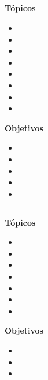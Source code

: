 \subsection{\OSSIETEDef }\label{sec:BOK-OS7}

\textbf{Tópicos}
\begin{itemize}
	\item \OSSIETETopicVision
	\item \OSSIETETopicPolitica
	\item \OSSIETETopicMetodos
	\item \OSSIETETopicProteccion
	\item \OSSIETETopicModelos
	\item \OSSIETETopicProteccionde
	\item \OSSIETETopicEncriptacion
	\item \OSSIETETopicAdministracion
\end{itemize}

\textbf{Objetivos}
\begin{itemize}
	\item \OSSIETEObjUNO
	\item \OSSIETEObjDOS
	\item \OSSIETEObjTRES
	\item \OSSIETEObjCUATRO
	\item \OSSIETEObjCINCO
\end{itemize}

\subsection{\OSOCHODef }\label{sec:BOK-OS8}

\textbf{Tópicos}
\begin{itemize}
	\item \OSOCHOTopicArchivos
	\item \OSOCHOTopicDirectorios
	\item \OSOCHOTopicSistemas
	\item \OSOCHOTopicTecnicas
	\item \OSOCHOTopicArchivosmapeados
	\item \OSOCHOTopicSistemasde
	\item \OSOCHOTopicNombrado
\end{itemize}

\textbf{Objetivos}
\begin{itemize}
	\item \OSOCHOObjUNO
	\item \OSOCHOObjDOS
	\item \OSOCHOObjTRES
\end{itemize}

